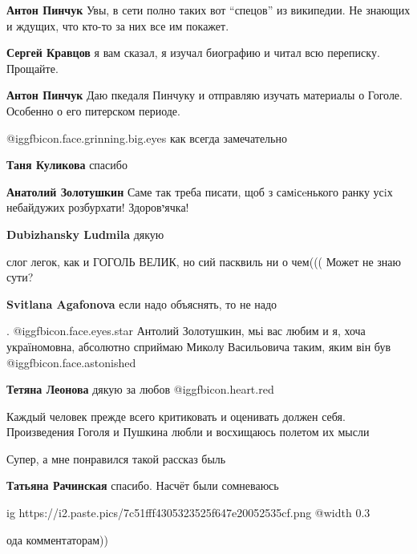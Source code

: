 \begin{itemize}
\begin{itemize}
\begin{itemize}
\textbf{Антон Пинчук} Увы, в сети полно таких вот \enquote{спецов} из википедии. Не знающих и ждущих, что кто-то за них все им покажет.

\textbf{Сергей Кравцов} я вам сказал, я изучал биографию и читал всю переписку. Прощайте.

\textbf{Антон Пинчук} Даю пкедаля Пинчуку и отправляю изучать материалы о Гоголе. Особенно о его питерском периоде.
\end{itemize} %

\end{itemize} %

 @igg{fbicon.face.grinning.big.eyes} как всегда замечательно

\begin{itemize} %
\textbf{Таня Куликова} спасибо

\textbf{Анатолий Золотушкин} Саме так треба писати, щоб з самiсeнького ранку усiх небайдужих розбурхати! Здоровיячка!

\textbf{Dubizhansky Ludmila} дякую
\end{itemize} %

слог легок, как и ГОГОЛЬ ВЕЛИК, но сий пасквиль ни о чем(((
Может не знаю сути?

\textbf{Svitlana Agafonova} если надо объяснять, то не надо

. @igg{fbicon.face.eyes.star} 
Антолий Золотушкин, мьі вас любим и я, хоча україномовна, абсолютно сприймаю
Миколу Васильовича таким, яким він був  @igg{fbicon.face.astonished} 

\textbf{Тетяна Леонова} дякую за любов @igg{fbicon.heart.red}

Каждый человек прежде всего критиковать и оценивать должен себя. Произведения
Гоголя и Пушкина любли и восхищаюсь полетом их мысли

Супер, а мне понравился такой рассказ быль

\textbf{Татьяна Рачинская} спасибо. Насчёт были сомневаюсь


\ifcmt
  ig https://i2.paste.pics/7c51fff4305323525f647e20052535cf.png
  @width 0.3
\fi

ода комментаторам))


\end{itemize}
